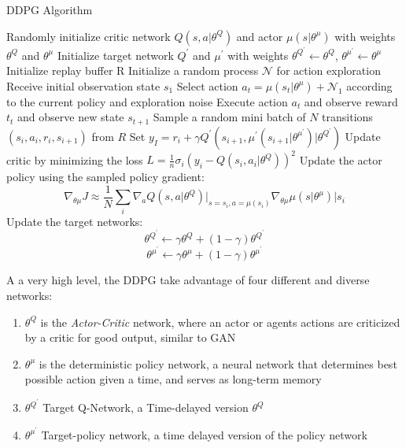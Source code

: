 \documentclass[doc, onecolumn, 12pt]{apa6}
\begin{document}
\begin{algorithm}[H]
\caption{DDPG Algorithm \citep{DDPG}}
\begin{algorithmic}[1]
\State Randomly initialize critic network $Q(s, a \vert \theta^{Q})$ and actor $\mu(s \vert \theta^{\mu})$ with weights $\theta^{Q}$ and $\theta^{\mu}$
\State Initialize target network $Q^{\prime}$ and $\mu^{\prime}$ with weights $\theta^{Q^{\prime}} \leftarrow \theta^{Q}$, $\theta^{\mu^{\prime}} \leftarrow \theta^{\mu}$
\State Initialize replay buffer R
	\State Initialize  a random process $\mathcal{N}$ for action exploration 
	\State Receive initial observation state $s_{1}$
		\State Select action $a_{t}= \mu(s_{t} \vert \theta^{\mu}) + \mathcal{N}_{1}$ according to the current policy and exploration noise
		\State Execute action $a_{t}$ and observe reward $t_{t}$ and observe new state $s_{t+1}$ 
		\State Sample a random mini batch of $N$ transitions $(s_{i}, a_{i}, r_{i}, s_{i+1})$ from $R$
		\State Set $y_{I} = r_{i} + \gamma Q^{\prime}(s_{i+1}, \mu^{\prime}(s_{i+1} \vert \theta^{\mu^{\prime}} ) \vert \theta^{Q^{\prime}})$
		\State Update critic by minimizing the loss $L= \frac{1}{n}\sigma_{i}(y_{i}-Q(s_{i},a_{i} \vert \theta^{Q}))^{2}$
		\State Update the actor policy using the sampled policy gradient: \[ \nabla_{\theta \mu} J \approx \frac{1}{N} \sum_{i} \nabla_{a} Q(s, a \vert \theta^{Q}) \vert_{s=s_{i}, a = \mu (s_{i})}  \nabla_{\theta\mu} \mu(s \vert \theta ^{\mu}) \vert s_{i} \]
		\State Update the target networks: 
			\[\theta^{Q^{\prime}} \leftarrow \gamma\theta^{Q} + (1- \gamma)\theta^{Q^{\prime}} \] 
			\[ 			\theta^{\mu^{\prime}} \leftarrow \gamma\theta^{\mu} + (1- \gamma)\theta^{\mu^{\prime}}  \]
	\EndFor
\EndFor
\end{algorithmic}
\end{algorithm}


A a very high level, the  DDPG take advantage of four different and diverse networks: \begin{enumerate}
\item $\theta^{Q}$  is the \emph{Actor-Critic} network, where an actor or agents actions are criticized by a critic for good output, similar to GAN
\item $\theta^{\mu}$ is the deterministic policy network, a neural network that determines best possible action given a time, and serves as long-term memory
\item $\theta^{Q^{\prime}}$ Target Q-Network, a Time-delayed version $\theta^{Q}$
\item $\theta^{\mu^{\prime}}$ Target-policy network, a time delayed version of the policy network
\end{enumerate} 
\end{document}
